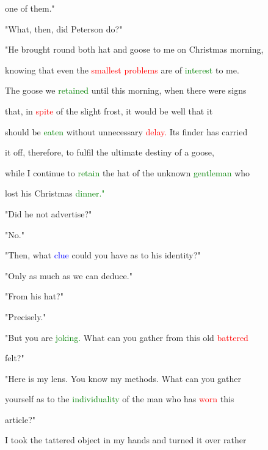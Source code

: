  one of them."



 "What, then, did Peterson do?"



 "He brought round both hat and goose to me on Christmas morning,

 knowing that even the \textcolor{red}{smallest} \textcolor{red}{problems} are of \textcolor{green}{interest} to me.

 The goose we \textcolor{green}{retained} until this morning, when there were signs

 that, in \textcolor{red}{spite} of the slight frost, it would be well that it

 should be \textcolor{green}{eaten} without unnecessary \textcolor{red}{delay.} Its finder has carried

 it off, therefore, to fulfil the \textcolor{BurntOrange}{ultimate} destiny of a goose,

 while I \textcolor{BurntOrange}{continue} to \textcolor{green}{retain} the hat of the \textcolor{BurntOrange}{unknown} \textcolor{green}{gentleman} who

 \textcolor{BurntOrange}{lost} his Christmas \textcolor{green}{dinner."}



 "Did he not advertise?"



 "No."



 "Then, what \textcolor{blue}{clue} could you have as to his identity?"



 "Only as much as we can deduce."



 "From his hat?"



 "Precisely."



 "But you are \textcolor{green}{joking.} What can you gather from this old \textcolor{red}{battered}

 felt?"



 "Here is my lens. You know my methods. What can you gather

 yourself as to the \textcolor{green}{individuality} of the man who has \textcolor{red}{worn} this

 article?"



 I took the tattered object in my hands and turned it over rather

